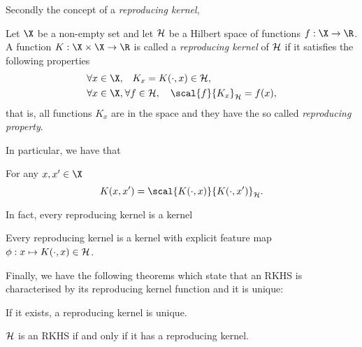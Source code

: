 Secondly the concept of a \emph{reproducing kernel},
\begin{definition}
\label{def:reproducing-kernel} Let \(\X\) be a non-empty set and let
\(\mathcal{H}\) be a Hilbert space of functions \(f: \X \to \R\). A function \(K:
\X \times \X \to \R\) is called a \textit{reproducing kernel} of \(\mathcal{H}\) if
it satisfies the following properties
\begin{align*} \forall x \in \X, & \quad K_x = K(\cdot, x) \in
                                   \rkhs{H}, \\ %
  \forall x \in \X, & \: \forall f \in \rkhs{H}, \quad \scal{f}{K_x}_{\rkhs{H}} = f(x), %
\end{align*} that is, all functions \(K_x\) are in the space and they have the so
called \textit{reproducing property}.
\end{definition} In particular, we have that
\begin{corollary}
  \label{cor:reproducing-property-kxy} For any \(x, x' \in \X\)
  \begin{equation*} K(x, x') = \scal{K(\cdot, x)}{K(\cdot, x')}_{\rkhs{H}}.
  \end{equation*}
\end{corollary} In fact, every reproducing kernel is a kernel
\begin{corollary}
 \label{cor:reproducing-kernel-is-a-kernel} Every reproducing kernel is a kernel
with explicit feature map \(\phi : x \mapsto K(\cdot, x) \in \mathcal{H}\).
\end{corollary}

Finally, we have the following theorems which state that an RKHS is
characterised by its reproducing kernel function and it is unique:
\begin{theorem}
\label{th:rep-kernel-is-unique} If it exists, a reproducing kernel is unique.
\end{theorem}

\begin{theorem}
\label{th:rep-kernel-defines-rkhs} \(\mathcal{H}\) is an RKHS if and only if it has
a reproducing kernel.
\end{theorem}

